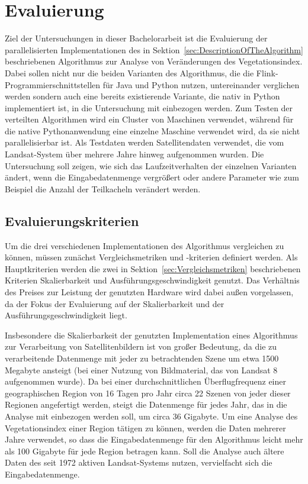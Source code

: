 \chapter{Evaluierung}
Ziel der Untersuchungen in dieser Bachelorarbeit ist die Evaluierung der parallelisierten Implementationen des in Sektion~\ref{sec:DescriptionOfTheAlgorithm} beschriebenen Algorithmus zur Analyse von Veränderungen des Vegetationsindex. Dabei sollen nicht nur die beiden Varianten des Algorithmus, die die Flink-Programmierschnittstellen für Java und Python nutzen, untereinander verglichen werden sondern auch eine bereits existierende Variante, die nativ in Python implementiert ist, in die Untersuchung mit einbezogen werden. Zum Testen der verteilten Algorithmen wird ein Cluster von Maschinen verwendet, während für die native Pythonanwendung eine einzelne Maschine verwendet wird, da sie nicht parallelisierbar ist. Als Testdaten werden Satellitendaten verwendet, die vom Landsat-System über mehrere Jahre hinweg aufgenommen wurden. Die Untersuchung soll zeigen, wie sich das Laufzeitverhalten der einzelnen Varianten ändert, wenn die Eingabedatenmenge vergrößert oder andere Parameter wie zum Beispiel die Anzahl der Teilkacheln verändert werden.

\section{Evaluierungskriterien}
\label{sec:evaluationCriteria}
Um die drei verschiedenen Implementationen des Algorithmus vergleichen zu können, müssen zunächst Vergleichsmetriken und -kriterien definiert werden. Als Hauptkriterien werden die zwei in Sektion~\ref{sec:Vergleichsmetriken} beschriebenen Kriterien Skalierbarkeit und Ausführungsgeschwindigkeit genutzt. Das Verhältnis des Preises zur Leistung der genutzten Hardware wird dabei außen vorgelassen, da der Fokus der Evaluierung auf der Skalierbarkeit und der Ausführungsgeschwindigkeit liegt. 

Insbesondere die Skalierbarkeit der genutzten Implementation eines Algorithmus zur Verarbeitung von Satellitenbildern ist von großer Bedeutung, da die zu verarbeitende Datenmenge mit jeder zu betrachtenden Szene um etwa 1500 Megabyte ansteigt (bei einer Nutzung von Bildmaterial, das von Landsat 8 aufgenommen wurde). Da bei einer durchschnittlichen Überflugfrequenz einer geographischen Region von 16 Tagen pro Jahr circa 22 Szenen von jeder dieser Regionen angefertigt werden, steigt die Datenmenge für jedes Jahr, das in die Analyse mit einbezogen werden soll, um circa 36 Gigabyte. Um eine Analyse des Vegetationsindex einer Region tätigen zu können, werden die Daten mehrerer Jahre verwendet, so dass die Eingabedatenmenge für den Algorithmus leicht mehr als 100 Gigabyte für jede Region betragen kann. Soll die Analyse auch ältere Daten des seit 1972 aktiven Landsat-Systems nutzen, vervielfacht sich die Eingabedatenmenge.

